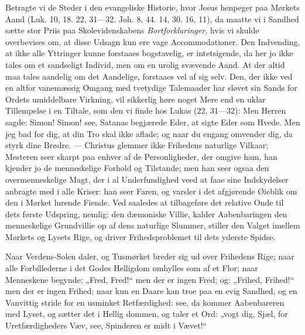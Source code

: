 \documentclass[12pt,a4paper]{book}
\begin{document}
Betragte vi de Steder i den evangeliske Historie, hvor Jesus henpeger paa Mørkets Aand
(Luk. 10, 18. 22, 31---32. Joh. 8, 44. 14, 30. 16, 11), da maatte vi i Sandhed sætte stor
Priis paa Skolevidenskabens \emph{Bortforklaringer,} hvis vi
skulde overbevises om, at disse Udsagn kun ere vage Accommodationer. Den Indvending, at
ikke alle Yttringer kunne forstaaes bogstavelig, er intetsigende, da her jo ikke tales om
et sandseligt Individ, men om en urolig svævende Aand. At der altid maa tales aandelig om
det Aandelige, forstaaes vel af sig selv. Den, der ikke ved en altfor vanemæssig Omgang
med tvetydige Talemaader har sløvet sin Sands for Ordets umiddelbare Virkning, vil
sikkerlig høre noget Mere end en uklar Tillempelse i en Tiltale, som den vi finde hos
Lukas (22, 31---32): {\large Men Herren sagde: Simon! Simon! see, Satanas begjærede Eder,
at sigte Eder som Hvede. Men jeg bad for dig, at din Tro skal ikke aflade; og naar du
engang omvender dig, da styrk dine Brødre.} --- Christus glemmer ikke Frihedens naturlige
Vilkaar; Mesteren seer skarpt paa enhver af de Personligheder, der omgive ham, han kjender
jo de menneskelige Forhold og Tilstande; men han seer ogsaa den overmenneskelige Magt, der
i al Underfundighed veed at faae sine Indskydelser anbragte med i alle Kriser: han seer
Faren, og varsler i det afgjørende Øieblik om den i Mørket lurende Fiende. Ved saaledes at
tilbageføre det relative Onde til dets første Udspring, nemlig: den dæmoniske Villie,
kalder Aabenbaringen den menneskelige Grundvillie op af dens naturlige Slummer, stiller
den Valget imellem Mørkets og Lysets Rige, og driver Frihedsproblemet til dets yderste
Spidse.

Naar Verdens-Solen daler, og Tusmørket breder sig ud over Frihedens Rige; naar alle
Forbillederne i det Godes Helligdom omhylles som af et Flor; naar Menneskene begynde:
„Fred, Fred!“ men der er ingen Fred; og: „Frihed, Frihed!“ men der er ingen Frihed; naar
kun en Daare kan troe paa en evig Sandhed, og en Vanvittig stride for en usminket
Retfærdighed: see, da kommer Aabenbareren med Lyset, og sætter det i Hellig\-%
dommen, og taler et Ord: „vogt dig, Sjæl, for Uretfærdigheders Væv, see, Spinderen er midt
i Vævet!“
\end{document}

